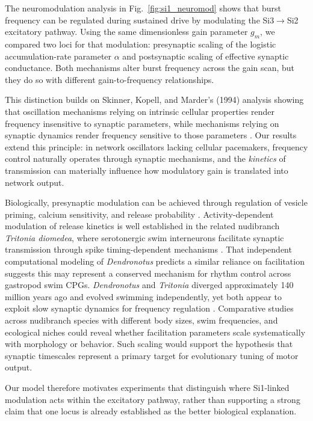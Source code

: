 The neuromodulation analysis in Fig.~\ref{fig:si1_neuromod} shows that burst frequency can be regulated during sustained drive by modulating the Si3$\to$Si2 excitatory pathway.
Using the same dimensionless gain parameter $g_m$, we compared two loci for that modulation: presynaptic scaling of the logistic accumulation-rate parameter $\alpha$ and postsynaptic scaling of effective synaptic conductance.
Both mechanisms alter burst frequency across the gain scan, but they do so with different gain-to-frequency relationships.

This distinction builds on Skinner, Kopell, and Marder's (1994) analysis showing that oscillation mechanisms relying on intrinsic cellular properties render frequency insensitive to synaptic parameters, while mechanisms relying on synaptic dynamics render frequency sensitive to those parameters \cite{SKM94}.
Our results extend this principle: in network oscillators lacking cellular pacemakers, frequency control naturally operates through synaptic mechanisms, and the \textit{kinetics} of transmission can materially influence how modulatory gain is translated into network output.

Biologically, presynaptic modulation can be achieved through regulation of vesicle priming, calcium sensitivity, and release probability \cite{NeherBrose2018, jackman2017mechanisms}.
Activity-dependent modulation of release kinetics is well established in the related nudibranch \textit{Tritonia diomedea}, where serotonergic swim interneurons facilitate synaptic transmission through spike timing-dependent mechanisms \cite{katz1994dynamic, sakurai2003spike}.
That independent computational modeling of \textit{Dendronotus} predicts a similar reliance on facilitation suggests this may represent a conserved mechanism for rhythm control across gastropod swim CPGs.
\textit{Dendronotus} and \textit{Tritonia} diverged approximately 140 million years ago and evolved swimming independently, yet both appear to exploit slow synaptic dynamics for frequency regulation \cite{newcomb2012homologues}.
Comparative studies across nudibranch species with different body sizes, swim frequencies, and ecological niches could reveal whether facilitation parameters scale systematically with morphology or behavior.
Such scaling would support the hypothesis that synaptic timescales represent a primary target for evolutionary tuning of motor output.

Our model therefore motivates experiments that distinguish where Si1-linked modulation acts within the excitatory pathway, rather than supporting a strong claim that one locus is already established as the better biological explanation.

